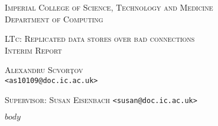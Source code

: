 \documentclass[11pt, a4paper, titlepage]{article}
\makeatletter
\newcommand{\mytitle}{LTc: Replicated data stores over bad connections\\[0.4cm]Interim Report}
\newcommand{\myauthor}{Alexandru Scvor\c tov}
\newcommand{\myemail}{\email{<as10109@doc.ic.ac.uk>}}
\newcommand{\email}[1]{\nolinkurl{#1}}
\makeatother
\begin{document}
\begin{titlepage}

  \begin{center}
    \textsc{Imperial College of Science, Technology and Medicine}\\[0.1cm]
    \textsc{Department of Computing}

    \vspace{3cm}

    \textsc{\Large \mytitle}

    \vspace{1cm}

    \textsc{\Large \myauthor}\\[0.1cm]
    \myemail

    \vspace{2cm}

    \textsc{Supervisor: Susan Eisenbach} \email{<susan@doc.ic.ac.uk>}
  \end{center}

\end{titlepage}

$body$


\end{document}
